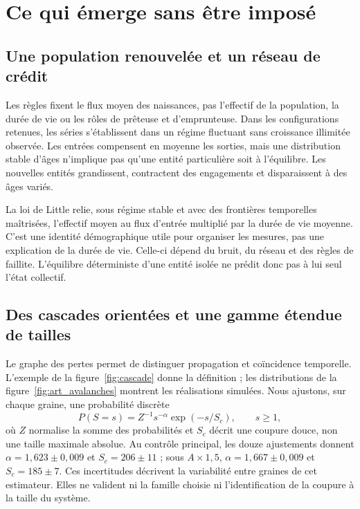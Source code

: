 \section{Ce qui émerge sans être imposé}\label{sec:systeme}
\subsection{Une population renouvelée et un réseau de crédit}
Les règles fixent le flux moyen des naissances, pas l'effectif de la
population, la durée de vie ou les rôles de prêteuse et d'emprunteuse.
Dans les configurations retenues, les séries s'établissent dans un régime
fluctuant sans croissance illimitée observée. Les entrées compensent en
moyenne les sorties, mais une distribution stable d'âges n'implique pas
qu'une entité particulière soit à l'équilibre. Les nouvelles entités
grandissent, contractent des engagements et disparaissent à des âges variés.

La loi de Little relie, sous régime stable et avec des frontières temporelles
maîtrisées, l'effectif moyen au flux d'entrée multiplié par la durée de vie
moyenne. C'est une identité démographique utile pour organiser les mesures,
pas une explication de la durée de vie. Celle-ci dépend du bruit, du réseau
et des règles de faillite. L'équilibre déterministe d'une entité isolée
ne prédit donc pas à lui seul l'état collectif.

\subsection{Des cascades orientées et une gamme étendue de tailles}
Le graphe des pertes permet de distinguer propagation et coïncidence temporelle.
L'exemple de la figure~\ref{fig:cascade} donne la définition ; les distributions
de la figure~\ref{fig:art_avalanches} montrent les réalisations simulées.
Nous ajustons, sur chaque graine, une probabilité discrète
\begin{equation}
 P(S=s)=Z^{-1}s^{-\alpha}\exp(-s/S_c),\qquad s\ge1,
 \label{eq:avalanche}
\end{equation}
où $Z$ normalise la somme des probabilités et $S_c$ décrit une coupure douce,
non une taille maximale absolue. Au contrôle principal, les douze ajustements
donnent $\alpha=1{,}623\pm0{,}009$ et $S_c=206\pm11$ ; sous
$A\times1{,}5$, $\alpha=1{,}667\pm0{,}009$ et $S_c=185\pm7$.
Ces incertitudes décrivent la variabilité entre graines de cet estimateur.
Elles ne valident ni la famille choisie ni l'identification de la coupure
à la taille du système.

